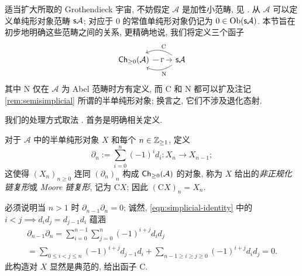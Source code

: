 适当扩大所取的 Grothendieck 宇宙, 不妨假定 $\mathcal{A}$ 是加性小范畴, 见 \cite[假设 1.5.2]{Li1}. 从 $\mathcal{A}$ 可以定义单纯形对象范畴 $\mathsf{s}\mathcal{A}$; 对应于 $0$ 的常值单纯形对象仍记为 $0 \in \operatorname{Ob}(\mathsf{s}\mathcal{A})$. 本节旨在初步地明确这些范畴之间的关系, 更精确地说, 我们将定义三个函子
\[\begin{tikzcd}
	\cate{Ch}_{\geq 0}(\mathcal{A}) \arrow[r, "\Gamma" description] & \cate{s}\mathcal{A} \arrow[bend left, l, "{\mathrm{N}}"] \arrow[bend right, l, "{\mathrm{C}}"']
\end{tikzcd}\]
其中 $\mathrm{N}$ 仅在 $\mathcal{A}$ 为 Abel 范畴时方有定义, 而 $\mathrm{C}$ 和 $\mathrm{N}$ 都可以扩及注记 \ref{rem:semisimplicial} 所谓的半单纯形对象; 换言之, 它们不涉及退化态射.

我们的处理方式取法 \cite[\S 1.2]{LuHA}. 首务是明确相关定义.

\begin{definition}[非正规化链复形]\label{def:unnormalized-chain}
	对于 $\mathcal{A}$ 中的半单纯形对象 $X$ 和每个 $n \in \mathbb{Z}_{\geq 1}$, 定义
	\[ \partial_n := \sum_{i=0}^n (-1)^i d_i: X_n \to X_{n-1}; \]
	这使得 $(X_n)_{n \geq 0}$ 连同 $(\partial_n)_n$ 构成 $\mathsf{Ch}_{\geq 0}(\mathcal{A})$ 的对象, 称为 $X$ 给出的\emph{非正规化链复形}或 \emph{Moore 链复形}, 记为 $\mathrm{C}X$; 因此 $(\mathrm{C}X)_n = X_n$.
\end{definition}

必须说明当 $n > 1$ 时 $\partial_{n-1}\partial_n = 0$; 诚然, \eqref{eqn:simplicial-identity} 中的 $i < j \implies d_i d_j = d_{j-1} d_i$ 蕴涵
\begin{multline*}
	\partial_{n-1} \partial_n = \sum_{i=0}^{n-1} \sum_{j=0}^n (-1)^{i+j} d_i d_j \\
	= \sum_{0 \leq i < j \leq n} (-1)^{i+j} d_{j-1} d_i + \sum_{n-1 \geq i \geq j \geq 0} (-1)^{i+j} d_i d_j = 0.
\end{multline*}
此构造对 $X$ 显然是典范的, 给出函子 $\mathrm{C}$.

